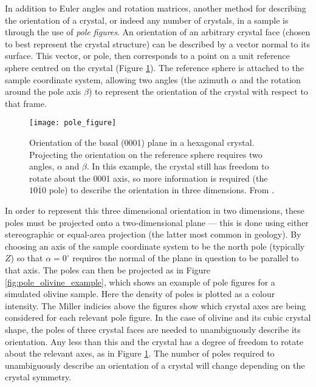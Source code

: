 \documentclass[a4paper,12pt,twoside]{report}
\numberwithin{equation}{chapter}
\begin{document}
In addition to Euler angles and rotation matrices, another method for describing the orientation of a crystal, or indeed any number of crystals, in a sample is through the use of \emph{pole figures}. An orientation of an arbitrary crystal face (chosen to best represent the crystal structure) can be described by a vector normal to its surface. This vector, or pole, then corresponds to a point on a unit reference sphere centred on the crystal (Figure \ref{fig:spherical_orientation}). The reference sphere is attached to the sample coordinate system, allowing two angles (the azimuth $\alpha$ and the rotation around the pole axis $\beta$) to represent the orientation of the crystal with respect to that frame.  




\begin{figure}[h!]
  \centering
    \texttt{[image: pole\_figure]}
  \caption[Pole figure visualisation]{Orientation of the basal (0001) plane in a hexagonal crystal. Projecting the orientation on the reference sphere requires two angles, $\alpha$ and $\beta$. In this example, the crystal still has freedom to rotate about the 0001 axis, so more information is required (the $\mathit{10\overline{1}0}$ pole) to describe the orientation in three dimensions. From \cite{Randle2000}.}
  \label{fig:spherical_orientation}
\end{figure}



In order to represent this three dimensional orientation in two dimensions, these poles must be projected onto a two-dimensional plane --- this is done using either stereographic or equal-area projection (the latter most common in geology). By choosing an axis of the sample coordinate system to be the north pole (typically $Z$) so that $\alpha = 0^\circ$ requires the normal of the plane in question to be parallel to that axis. The poles can then be projected as in Figure \ref{fig:pole_olivine_example}, which shows an example of pole figures for a simulated olivine sample. Here the density of poles is plotted as a colour intensity. The Miller indicies above the figures show which crystal axes are being considered for each relevant pole figure. In the case of olivine and its cubic crystal shape, the poles of three crystal faces are needed to unambiguously describe its orientation. Any less than this and the crystal has a degree of freedom to rotate about the relevant axes, as in Figure \ref{fig:spherical_orientation}. The number of poles required to unambiguously describe an orientation of a crystal will change depending on the crystal symmetry.
\end{document}
